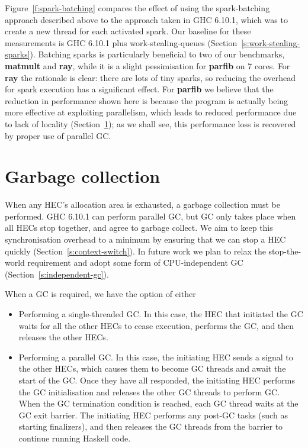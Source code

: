 \documentclass[twocolumn,9pt]{sigplanconf}
\begin{document}
Figure~\ref{f:spark-batching} compares the effect of using the
spark-batching approach described above to the approach taken in GHC
6.10.1, which was to create a new thread for each activated spark.
Our baseline for these measurements is GHC 6.10.1 plus
work-stealing-queues (Section~\ref{s:work-stealing-sparks}).  Batching
sparks is particularly beneficial to two of our benchmarks,
\textbf{matmult} and \textbf{ray}, while it is a slight pessimisation
for \textbf{parfib} on 7 cores.  For \textbf{ray} the rationale is
clear: there are lots of tiny sparks, so reducing the overhead for
spark execution has a significant effect.  For \textbf{parfib} we
believe that the reduction in performance shown here is because the
program is actually being more effective at exploiting parallelism,
which leads to reduced performance due to lack of locality
(Section~\ref{s:parallel-gc}); as we shall see, this performance
loss is recovered by proper use of parallel GC.

\section{Garbage collection}
\label{s:parallel-gc}

When any HEC's allocation area is exhausted, a garbage collection must
be performed.  GHC 6.10.1 can perform parallel GC, but GC only takes place
when all HECs stop together, and agree to garbage collect.
We aim to keep this synchronisation 
overhead to a minimum by ensuring that we can stop a HEC
quickly (Section~\ref{s:context-switch}).  In future work we plan to
relax the stop-the-world requirement and adopt some form of
CPU-independent GC (Section~\ref{s:independent-gc}).

When a GC is required, we have the option of either
\begin{itemize}
\item Performing a single-threaded GC.  In this case, the HEC that
  initiated the GC waits for all the other HECs to cease execution,
  performs the GC, and then releases the other HECs.

\item Performing a parallel GC.  In this case, the initiating HEC
  sends a signal to the other HECs, which causes them to become GC
  threads and await the start of the GC.  Once they have all responded,
  the initiating HEC performs the GC initialisation and
  releases the other GC threads to perform GC.  When the GC
  termination condition is reached, each GC thread waits at the GC
  exit barrier.  The initiating HEC performs any post-GC tasks (such
  as starting finalizers), and then releases the GC threads from the
  barrier to continue running Haskell code.
\end{itemize}
\end{document}
